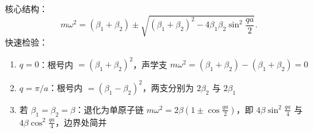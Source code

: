\begin{thinkbox}
核心结构：
\[
m\omega^2 = (\beta_1+\beta_2) \pm \sqrt{(\beta_1+\beta_2)^2 - 4\beta_1\beta_2\sin^2\frac{qa}{2}}.
\]
快速检验：
\begin{enumerate}
    \item $q=0$：根号内 $=(\beta_1+\beta_2)^2$，声学支 $m\omega^2=(\beta_1+\beta_2)-(\beta_1+\beta_2)=0$ \checkmark
    \item $q=\pi/a$：根号内 $=(\beta_1-\beta_2)^2$，两支分别为 $2\beta_2$ 与 $2\beta_1$ \checkmark
    \item 若 $\beta_1=\beta_2=\beta$：退化为单原子链 $m\omega^2 = 2\beta(1\pm\cos\frac{qa}{2})$，即 $4\beta\sin^2\frac{qa}{4}$ 与 $4\beta\cos^2\frac{qa}{4}$，边界处简并 \checkmark
\end{enumerate}
\end{thinkbox}
